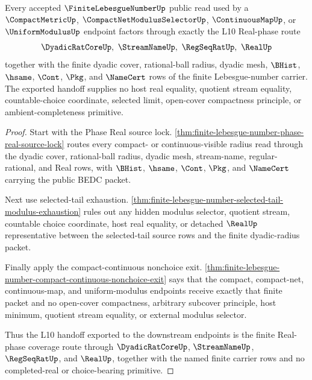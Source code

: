 \begin{theorem}
\label{thm:finite-lebesgue-number-real-phase-coverage-export}
Every accepted $\FiniteLebesgueNumberUp$ public read used by a $\CompactMetricUp$, $\CompactNetModulusSelectorUp$, $\ContinuousMapUp$, or $\UniformModulusUp$ endpoint factors through exactly the L10 Real-phase route
$$
\DyadicRatCoreUp,\ \StreamNameUp,\ \RegSeqRatUp,\ \RealUp
$$
together with the finite dyadic cover, rational-ball radius, dyadic mesh, $\BHist$, $\hsame$, $\Cont$, $\Pkg$, and $\NameCert$ rows of the finite Lebesgue-number carrier. The exported handoff supplies no host real equality, quotient stream equality, countable-choice coordinate, selected limit, open-cover compactness principle, or ambient-completeness primitive.
\end{theorem}
\begin{proof}
Start with the Phase Real source lock. \autoref{thm:finite-lebesgue-number-phase-real-source-lock} routes every compact- or continuous-visible radius read through the dyadic cover, rational-ball radius, dyadic mesh, stream-name, regular-rational, and Real rows, with $\BHist$, $\hsame$, $\Cont$, $\Pkg$, and $\NameCert$ carrying the public BEDC packet.

Next use selected-tail exhaustion. \autoref{thm:finite-lebesgue-number-selected-tail-modulus-exhaustion} rules out any hidden modulus selector, quotient stream, countable choice coordinate, host real equality, or detached $\RealUp$ representative between the selected-tail source rows and the finite dyadic-radius packet.

Finally apply the compact-continuous nonchoice exit. \autoref{thm:finite-lebesgue-number-compact-continuous-nonchoice-exit} says that the compact, compact-net, continuous-map, and uniform-modulus endpoints receive exactly that finite packet and no open-cover compactness, arbitrary subcover principle, host minimum, quotient stream equality, or external modulus selector.

Thus the L10 handoff exported to the downstream endpoints is the finite Real-phase coverage route through $\DyadicRatCoreUp$, $\StreamNameUp$, $\RegSeqRatUp$, and $\RealUp$, together with the named finite carrier rows and no completed-real or choice-bearing primitive.
\end{proof}
